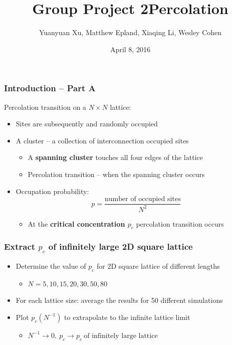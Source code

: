 \documentclass[mathserif,18pt,xcolor=table]{beamer}
\title[Group Project 2]{Group Project 2\newline Percolation}
\author[Xu, Epland, Li, Cohen]{{\small Yuanyuan Xu, Matthew Epland, Xiaqing Li, Wesley Cohen}}
\institute{Duke University}
\date{April 8, 2016}
\begin{document}
\beamertemplateballitem
\frame{\titlepage}




\begin{frame}
	\frametitle{Introduction -- Part A}
	Percolation transition on a $N\times N$ lattice:
	\begin{itemize}
		\item Sites are subsequently and randomly occupied
		\item A cluster -- a collection of interconnection occupied sites
		\begin{itemize}
			\item A \textbf{spanning cluster} touches all four edges of the lattice
			\item Percolation transition -- when the spanning cluster occurs
		\end{itemize}
		\item Occupation probability: 
			\begin{equation}
			p=\frac{\text{number of occupied sites}}{N^2}
			\end{equation}
		\begin{itemize}
			\item At the \textbf{critical concentration $p_c$} percolation transition occurs
		\end{itemize}
	\end{itemize}
\end{frame}


\begin{frame}
	\frametitle{Extract $p_c$ of infinitely large 2D square lattice}
	\begin{itemize}
		\item Determine the value of $p_c$ for 2D square lattice of different lengths \\
		 \begin{itemize}
			\item $N= 5, 10, 15, 20, 30, 50, 80$		
		\end{itemize}
		 \bigskip
		 \item For each lattice size: average the results for 50 different simulations
		 \bigskip
		 \item Plot $p_c(N^{-1})$ to extrapolate to the infinite lattice limit
		 \begin{itemize}
		 	\smallskip
			\item $N^{-1}\rightarrow 0,\  p_c \rightarrow p_c \  \text{of infinitely large lattice}$	
		\end{itemize}
	\end{itemize}
\end{frame}
\end{document}
